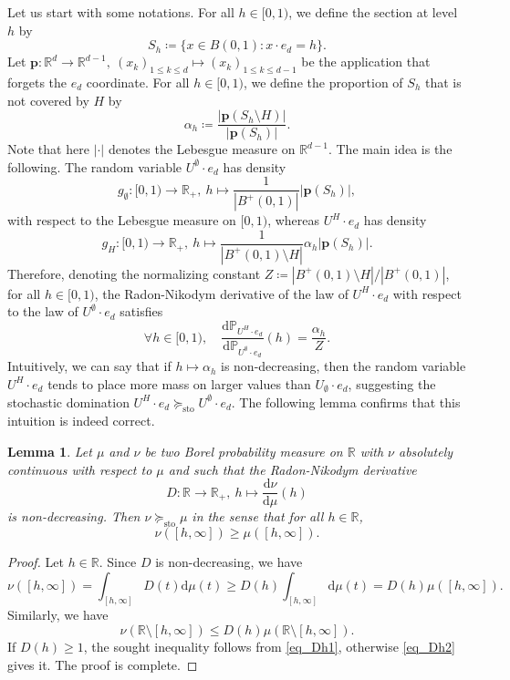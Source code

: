 \documentclass[a4paper, 11pt]{article}
\theoremstyle{plain}
\newtheorem{Lemma}[Theorem]{Lemma}
\theoremstyle{definition}
\newcommand{\R}{\mathbb{R}}
\renewcommand{\P}{\mathbb{P}}
\numberwithin{equation}{section}
\begin{document}
Let us start with some notations. For all $h\in[0, 1)$, we define the section at level $h$ by
    \[S_h\coloneqq \{x\in B(0,1):x\cdot e_d=h\}.\]
Let $\mathbf p:\R^d\rightarrow\R^{d-1},~(x_k)_{1\leq k\leq d}\mapsto(x_k)_{1\leq k\leq d-1}$ be the application that forgets the $e_d$ coordinate. For all $h\in[0,1)$, we define the proportion of $S_h$ that is not covered by $H$ by
    \[\alpha_h\coloneqq\frac{|\mathbf p(S_h\setminus H)|}{|\mathbf p(S_h)|}.\]
Note that here $|\cdot|$ denotes the Lebesgue measure on $\R^{d-1}$. The main idea is the following. The random variable $U^\emptyset\cdot e_d$ has density
    \[g_\emptyset:[0,1)\to\R_+,~h\mapsto \frac{1}{|B^+(0,1)|}|\mathbf p(S_h)|,\]
with respect to the Lebesgue measure on $[0,1)$, whereas $U^H\cdot e_d$ has density
    \[g_H:[0,1)\to\R_+,~h\mapsto \frac{1}{|B^+(0,1)\setminus H|}\alpha_h|\mathbf p(S_h)|.\]
Therefore, denoting the normalizing constant $Z\coloneqq|B^+(0,1)\setminus H|/|B^+(0, 1)|$, for all $h\in[0,1)$, the Radon-Nikodym derivative of the law of $U^H\cdot e_d$ with respect to the law of $U^\emptyset\cdot e_d$ satisfies
    \begin{equation}
        \label{eq_radon_nikodym}
        \forall h\in[0,1),\quad\frac{\mathrm{d}\P_{U^H\cdot e_d}}{\mathrm{d}\P_{U^\emptyset\cdot e_d}}(h)=\frac{\alpha_h}{Z}.
    \end{equation}
Intuitively, we can say that if $h\mapsto\alpha_h$ is non-decreasing, then the random variable $U^H\cdot e_d$ tends to place more mass on larger values than $U_\emptyset\cdot e_d$, suggesting the stochastic domination $U^H\cdot e_d\succeq_{\mathrm{sto}}U^\emptyset\cdot e_d$. The following lemma confirms that this intuition is indeed correct.


\begin{Lemma}
    \label{lemma_radon_sto_dom}
    Let $\mu$ and $\nu$ be two Borel probability measure on $\R$ with $\nu$ absolutely continuous with respect to $\mu$ and such that the Radon-Nikodym derivative
        \[D:\R\to\R_+,~h\mapsto\frac{\mathrm{d}\nu}{\mathrm{d}\mu}(h)\]
    is non-decreasing. Then $\nu\succeq_{\mathrm{sto}}\mu$ in the sense that for all $h\in\R$,
        \[\nu([h, \infty])\geq\mu([h,\infty]).\]
\end{Lemma}

\begin{proof}
    Let $h\in\R$. Since $D$ is non-decreasing, we have
        \begin{equation}
            \label{eq_Dh1}
            \nu([h, \infty])=\int_{[h,\infty]} D(t)\mathrm{d}\mu(t)\geq D(h)\int_{[h,\infty]}\mathrm{d}\mu(t)=D(h)\mu([h,\infty]).
        \end{equation}
    Similarly, we have
        \begin{equation}
            \label{eq_Dh2}
            \nu(\R\setminus[h, \infty])\leq D(h)\mu(\R\setminus[h, \infty]).
        \end{equation}
    If $D(h)\geq1$, the sought inequality follows from \eqref{eq_Dh1}, otherwise \eqref{eq_Dh2} gives it. The proof is complete.
\end{proof}
\end{document}
